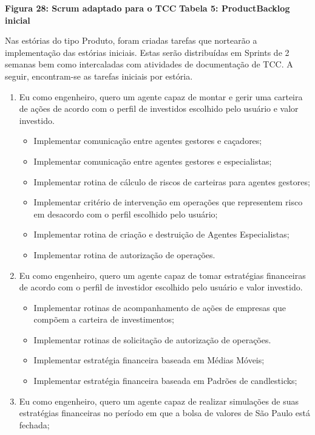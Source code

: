 \textbf{Figura 28: Scrum adaptado para o TCC}
\textbf{Tabela 5: ProductBacklog inicial}

Nas estórias do tipo Produto, foram criadas tarefas que nortearão a implementação das estórias iniciais. Estas serão distribuídas em Sprints de 2 semanas bem como intercaladas com atividades de documentação de TCC. A seguir, encontram-se as tarefas iniciais por estória.

\begin{enumerate}
\item Eu como engenheiro, quero um agente capaz de montar e gerir uma carteira de ações de acordo com o perfil de investidos escolhido pelo usuário e valor investido.
		\begin{itemize}
		\item Implementar comunicação entre agentes gestores e caçadores;
		\item Implementar comunicação entre agentes gestores e especialistas;
		\item Implementar rotina de cálculo de riscos de carteiras para agentes gestores;
		\item Implementar critério de intervenção em operações que representem risco em desacordo com o perfil escolhido pelo usuário;
		\item Implementar rotina de criação e destruição de Agentes Especialistas;
		\item Implementar rotina de autorização de operações.
		\end{itemize}
\item Eu como engenheiro, quero um agente capaz de tomar estratégias financeiras de acordo com o perfil de investidor escolhido pelo usuário e valor investido.
		\begin{itemize}
		\item Implementar rotinas de acompanhamento de ações de empresas que compõem a carteira de investimentos;
		\item Implementar rotinas de solicitação de autorização de operações.
		\item Implementar estratégia financeira baseada em Médias Móveis;
		\item Implementar estratégia financeira baseada em Padrões de candlesticks; 
		\end{itemize}
\item Eu como engenheiro, quero um agente capaz de realizar simulações de suas estratégias financeiras no período em que a bolsa de valores de São Paulo está fechada;
		\begin{itemize}

\end{itemize}
\end{enumerate}
